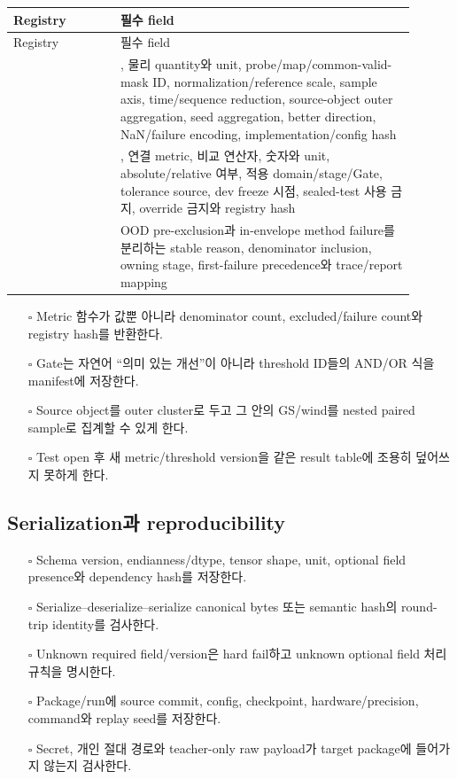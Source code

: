 \documentclass[10pt]{article}
\begin{document}
\begin{longtable}{L{0.24\linewidth}L{0.66\linewidth}}
\toprule
Registry & 필수 field\\
\midrule
\endfirsthead
\toprule
Registry & 필수 field\\
\midrule
\endhead
{} & , 물리 quantity와 unit, probe/map/common-valid-mask ID,
normalization/reference scale, sample axis, time/sequence reduction, source-object outer aggregation,
seed aggregation, better direction, NaN/failure encoding, implementation/config hash\\
 & , 연결 metric, 비교 연산자, 숫자와 unit,
absolute/relative 여부, 적용 domain/stage/Gate, tolerance source, dev freeze 시점, sealed-test 사용 금지,
override 금지와 registry hash\\
 & OOD pre-exclusion과 in-envelope method failure를 분리하는 stable reason,
denominator inclusion, owning stage, first-failure precedence와 trace/report mapping\\
\end{longtable}

\begin{itemize}
  \item[$\square$] Metric 함수가 값뿐 아니라 denominator count, excluded/failure count와 registry hash를 반환한다.
  \item[$\square$] Gate는 자연어 ``의미 있는 개선''이 아니라 threshold ID들의 AND/OR 식을 manifest에 저장한다.
  \item[$\square$] Source object를 outer cluster로 두고 그 안의 GS/wind를 nested paired sample로 집계할 수 있게 한다.
  \item[$\square$] Test open 후 새 metric/threshold version을 같은 result table에 조용히 덮어쓰지 못하게 한다.
\end{itemize}

\subsection{Serialization과 reproducibility}

\begin{itemize}
  \item[$\square$] Schema version, endianness/dtype, tensor shape, unit, optional field presence와 dependency hash를 저장한다.
  \item[$\square$] Serialize--deserialize--serialize canonical bytes 또는 semantic hash의 round-trip identity를 검사한다.
  \item[$\square$] Unknown required field/version은 hard fail하고 unknown optional field 처리 규칙을 명시한다.
  \item[$\square$] Package/run에 source commit, config, checkpoint, hardware/precision, command와 replay seed를 저장한다.
  \item[$\square$] Secret, 개인 절대 경로와 teacher-only raw payload가 target package에 들어가지 않는지 검사한다.
\end{itemize}
\end{document}
